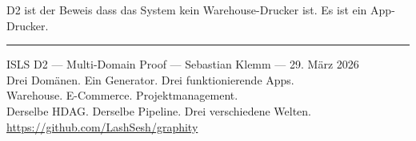 \documentclass[11pt,a4paper]{article}
\begin{document}
D2 ist der Beweis dass das System kein Warehouse-Drucker ist.
Es ist ein App-Drucker.

\vfill
\noindent\rule{\textwidth}{0.4pt}
\begin{center}
\small
ISLS D2 --- Multi-Domain Proof --- Sebastian Klemm --- 29. M\"arz 2026\\
Drei Dom\"anen. Ein Generator. Drei funktionierende Apps.\\
Warehouse. E-Commerce. Projektmanagement.\\
Derselbe HDAG. Derselbe Pipeline. Drei verschiedene Welten.\\
\url{https://github.com/LashSesh/graphity}
\end{center}
\end{document}

